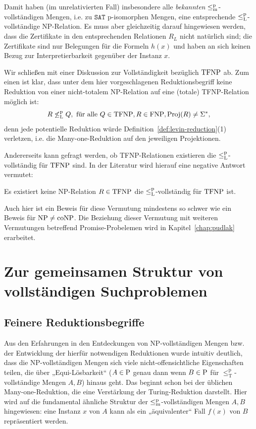 Damit haben (im unrelativierten Fall) insbesondere alle \emph{bekannten} $\leqmp$-vollständigen Mengen, i.e. zu $\mathtt{SAT}$ p-isomorphen Mengen, eine entsprechende $\leqlp$-vollständige NP-Relation.
Es muss aber gleichzeitig darauf hingewiesen werden, dass die Zertifikate in den entsprechenden Relationen $R_L$ nicht natürlich sind; die Zertifikate sind nur Belegungen für die Formeln $h(x)$ und haben an sich keinen Bezug zur Interpretierbarkeit gegenüber der Instanz $x$.

Wir schließen mit einer Diskussion zur Vollständigkeit bezüglich $\TFNP$ ab. Zum einen ist klar, dass unter dem hier vorgeschlagenen Reduktionsbegriff keine Reduktion von einer nicht-totalem NP-Relation auf eine (totale) TFNP-Relation möglich ist: 
\[ R \not\leqlp Q, \text{ für alle } Q\in\TFNP, R\in\FNP, \Proj(R)\neq\Sigma^*, \]
denn jede potentielle Reduktion würde Definition~\ref{def:levin-reduction}(1) verletzen, i.e. die Many-one-Reduktion auf den jeweiligen Projektionen.

Andererseits kann gefragt werden, ob TFNP-Relationen existieren die $\leqlp$-vollständig für $\TFNP$ sind. In der Literatur \parencite[vgl.][]{pudlak_incompleteness_2017} wird hierauf eine negative Antwort vermutet:
\begin{conjecture}[\hTFNP]
    Es existiert keine NP-Relation $R\in\TFNP$ die $\leqlp$-vollständig für $\TFNP$ ist.
\end{conjecture}
Auch hier ist ein Beweis für diese Vermutung mindestens so schwer wie ein Beweis für $\NP\neq\coNP$. Die Beziehung dieser Vermutung mit weiteren Vermutungen betreffend Promise-Probelemen wird in Kapitel~\ref{chap:pudlak} erarbeitet.

\section{Zur gemeinsamen Struktur von vollständigen Suchproblemen}\label{sec:gemeinsame-struktur}

\subsection*{Feinere Reduktionsbegriffe}

Aus den Erfahrungen in den Entdeckungen von NP-vollständigen Mengen bzw. der Entwicklung der hierfür notwendigen Reduktionen wurde intuitiv deutlich, dass die NP-vollständigen Mengen sich viele nicht-offensichtliche Eigenschaften teilen, die über „Equi-Lösbarkeit“ ($A\in \P$ genau dann wenn $B\in \P$ für $\leq_\mathrm T^\mathrm p$-vollständige Mengen $A,B$) hinaus geht.
%
Das beginnt schon bei der üblichen Many-one-Reduktion, die eine Verstärkung der Turing-Reduktion darstellt. Hier wird auf die fundamental ähnliche Struktur der $\leqmp$-vollständigen Mengen $A, B$ hingewiesen: eine Instanz $x$ von $A$ kann als ein „äquivalenter“ Fall $f(x)$ von $B$ repräsentiert werden.

